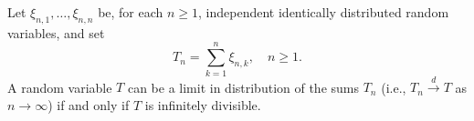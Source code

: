 Let $\xi_{n,1}, \ldots, \xi_{n,n}$ be, for each $n \geq 1$, independent identically distributed random variables, and set
$$T_n = \sum_{k=1}^{n} \xi_{n,k}, \quad n \geq 1.$$
A random variable $T$ can be a limit in distribution of the sums $T_n$ (i.e., $T_n \xrightarrow{d} T$ as $n \to \infty$) if and only if $T$ is infinitely divisible.
